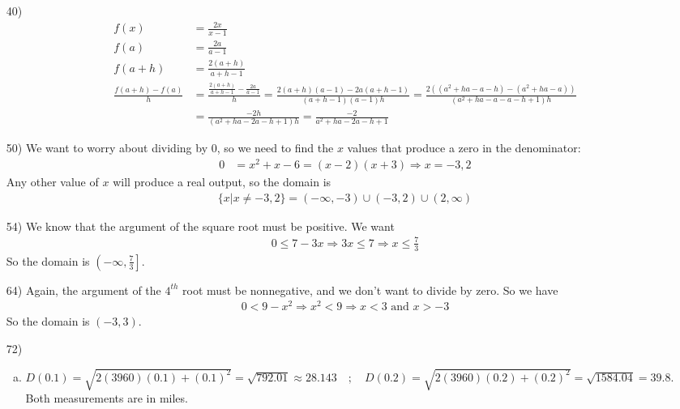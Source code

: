 \documentclass[fleqn]{article}
\begin{document}
\begin{enumerate}
\item[40)]
\begin{align*}
f(x) &= \frac{2x}{x-1} \\
f(a) &= \frac{2a}{a-1} \\
f(a + h) &= \frac{2(a+h)}{a+h-1} \\ %
\frac{f(a+h) - f(a)}{h} &= \frac{ \frac{2(a + h)}{a + h - 1} - \frac{2a}{a-1} }{h} 
= \frac{ 2(a + h)(a-1) - 2a(a + h - 1) }{(a + h - 1)(a - 1)h}
= \frac{ 2( (a^2 + ha - a - h) - (a^2 + ha - a) )}{(a^2 + ha - a - a - h + 1)h} \\
&= \frac{ -2h }{ (a^2 + ha - 2a - h + 1)h }
= \frac{ -2 }{ a^2 + ha - 2a - h + 1 }
\end{align*}

\item[50)]
We want to worry about dividing by 0, so we need to find the $x$ values that produce a zero in the denominator:
\begin{align*}
0 &= x^2 + x - 6 = (x - 2)(x + 3) \Rightarrow x = -3, 2
\end{align*}
Any other value of $x$ will produce a real output, so the domain is
\begin{align*}
\{ x | x \not= -3, 2 \} = (-\infty, -3)\cup(-3, 2)\cup(2, \infty)
\end{align*}

\item[54)]
We know that the argument of the square root must be positive. 
We want
\begin{align*}
0 \leq 7 - 3x \Rightarrow 3x \leq 7 \Rightarrow x \leq \frac{7}{3}
\end{align*}
So the domain is $\left( -\infty, \frac{7}{3} \right]$.

\item[64)]
Again, the argument of the $4^{th}$ root must be nonnegative, and we don't want to divide by zero.
So we have
\begin{align*}
0 < 9 - x^2 \Rightarrow x^2 < 9 \Rightarrow x < 3 \text{ and } x > -3
\end{align*}
So the domain is $(-3, 3)$.

\item[72)]
\begin{enumerate}[(a)]
\item 
$D(0.1) = \sqrt{2(3960)(0.1) + (0.1)^2} = \sqrt{792.01} \approx 28.143 \quad;\quad
D(0.2) = \sqrt{2(3960)(0.2) + (0.2)^2} = \sqrt{1584.04} = 39.8$. Both measurements are in miles.


\end{enumerate}
\end{enumerate}
\end{document}
